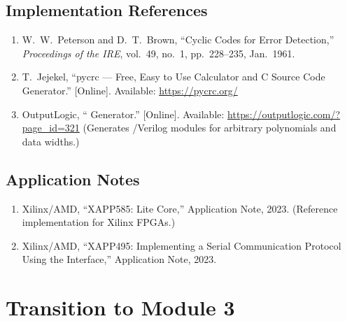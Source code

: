 \documentclass[11pt,letterpaper]{article}
\begin{document}
	\subsection{\CRC{} Implementation References}

	\begin{enumerate}[leftmargin=2em]
		\item W.\ W.\ Peterson and D.\ T.\ Brown, ``Cyclic Codes for Error Detection,'' \textit{Proceedings of the IRE}, vol.~49, no.~1, pp.~228--235, Jan.\ 1961.
		\item T.\ Jejekel, ``pycrc --- Free, Easy to Use \CRC{} Calculator and C Source Code Generator.'' [Online]. Available: \url{https://pycrc.org/}
		\item OutputLogic, ``\CRC{} Generator.'' [Online]. Available: \url{https://outputlogic.com/?page_id=321} (Generates \VHDL{}/Verilog \CRC{} modules for arbitrary polynomials and data widths.)
	\end{enumerate}

	\subsection{Application Notes}

	\begin{enumerate}[leftmargin=2em]
		\item Xilinx/AMD, ``XAPP585: \UART{} Lite Core,'' Application Note, 2023. (Reference \UART{} implementation for Xilinx FPGAs.)
		\item Xilinx/AMD, ``XAPP495: Implementing a Serial Communication Protocol Using the \SPI{} Interface,'' Application Note, 2023.
	\end{enumerate}

	\newpage
	\section{Transition to Module 3}
\end{document}
